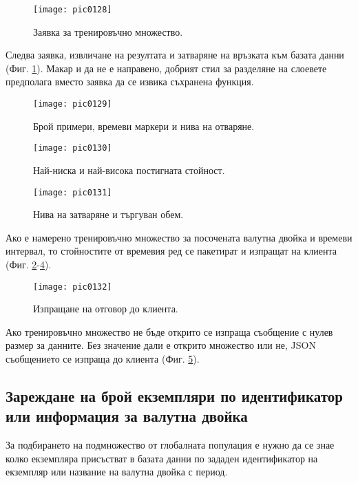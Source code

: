 \begin{figure}[h]
  \centering
  \texttt{[image: pic0128]}
  \caption{Заявка за тренировъчно множество.}
\label{fig:pic0128}
\end{figure}
\FloatBarrier

Следва заявка, извличане на резултата и затваряне на връзката към базата данни (Фиг. \ref{fig:pic0128}). Макар и да не е направено, добрият стил за разделяне на слоевете предполага вместо заявка да се извика съхранена функция. 

\begin{figure}[h]
  \centering
  \texttt{[image: pic0129]}
  \caption{Брой примери, времеви маркери и нива на отваряне.}
\label{fig:pic0129}
\end{figure}
\FloatBarrier

\begin{figure}[h]
  \centering
  \texttt{[image: pic0130]}
  \caption{Най-ниска и най-висока постигната стойност.}
\label{fig:pic0130}
\end{figure}
\FloatBarrier

\begin{figure}[h]
  \centering
  \texttt{[image: pic0131]}
  \caption{Нива на затваряне и търгуван обем.}
\label{fig:pic0131}
\end{figure}
\FloatBarrier

Ако е намерено тренировъчно множество за посочената валутна двойка и времеви интервал, то стойностите от времевия ред се пакетират и изпращат на клиента (Фиг. \ref{fig:pic0129}-\ref{fig:pic0131}).

\begin{figure}[h]
  \centering
  \texttt{[image: pic0132]}
  \caption{Изпращане на отговор до клиента.}
\label{fig:pic0132}
\end{figure}
\FloatBarrier

Ако тренировъчно множество не бъде открито се изпраща съобщение с нулев размер за данните. Без значение дали е открито множество или не, JSON съобщението се изпраща до клиента (Фиг. \ref{fig:pic0132}).

\subsection{Зареждане на брой екземпляри по идентификатор или информация за валутна двойка}

За подбирането на подмножество от глобалната популация е нужно да се знае колко екземпляра присъстват в базата данни по зададен идентификатор на екземпляр или название на валутна двойка с период. 

